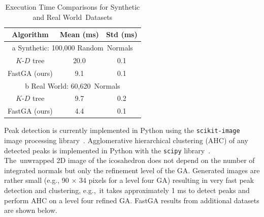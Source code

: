 \begin{table}[H]
    \centering
    \caption{Execution Time Comparisons for Synthetic and Real World~Datasets} \label{table:results_fastga}%
   
       
       \begin{tabular}{@{}ccc@{}}
        \toprule
        \textbf{Algorithm} & \textbf{Mean (ms)} & \textbf{Std (ms)} \\ \midrule
        \multicolumn{3}{c}{ a Synthetic: 100,000 Random~Normals} \\ \midrule
        $K$-$D$ tree    & 20.0      & 0.1      \\
        FastGA (ours)  & 9.1       & 0.1      \\ \midrule
     \multicolumn{3}{c}{ b Real World: 60,620~Normals} \\ \midrule
        
        $K$-$D$ tree & 9.7       & 0.2      \\
        FastGA (ours)      & 4.4       & 0.1      \\ \bottomrule
        \end{tabular}
\end{table}

Peak detection is currently implemented in Python using the \texttt{scikit-image} image processing library~\cite{van_der_walt_scikit-image_2014}. Agglomerative hierarchical clustering (AHC) of any detected peaks is implemented in Python with the \texttt{scipy} library~\cite{virtanen_scipy_2020}. The~unwrapped 2D image of the icosahedron does not depend on the number of integrated normals but only the refinement level of the GA. Generated images are rather small (e.g., 90 $\times$ 34 pixels for a level four GA) resulting in very fast peak detection and clustering, e.g.,~it takes approximately 1 ms to detect peaks and perform AHC on a level four refined GA.  FastGA results from additional datasets are shown below. %

